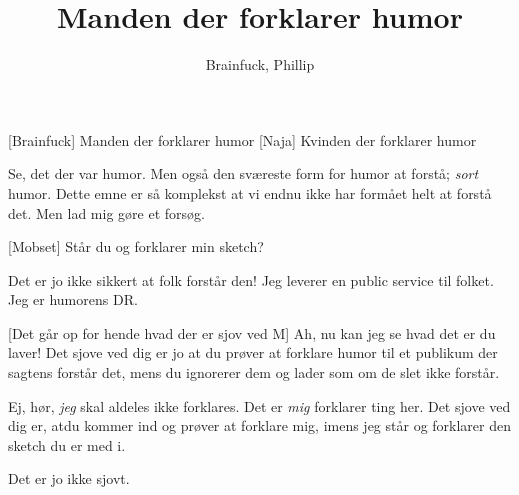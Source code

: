 \documentclass[a4paper,11pt]{article}
\title{Manden der forklarer humor}
\author{Brainfuck, Phillip}
\begin{document}
\maketitle

\begin{roles}
[Brainfuck] Manden der forklarer humor
[Naja] Kvinden der forklarer humor
\end{roles}
  
\begin{sketch}


 Se, det der var humor.  Men også den sværeste form for humor at 
forstå; \emph{sort} humor.  Dette emne er så komplekst at vi endnu ikke har
formået helt at forstå det.  Men lad mig gøre et forsøg.


[Mobset] Står du og forklarer min sketch?

 Det er jo ikke sikkert at folk forstår den!  Jeg leverer en public
service til folket.  Jeg er humorens DR.

[Det går op for hende hvad der er sjov ved M] Ah, nu kan jeg se hvad
det er du laver!  Det sjove ved dig er jo at du prøver at forklare humor til
et publikum der sagtens forstår det, mens du ignorerer dem og lader som om de
slet ikke forstår.

 Ej, hør, \emph{jeg} skal aldeles ikke forklares.  Det er \emph{mig}
forklarer ting her.  Det sjove ved dig er, atdu kommer ind og prøver at 
forklare mig, imens jeg står og forklarer den sketch du er med i.


 Det er jo ikke sjovt.


\end{sketch}
\end{document}
